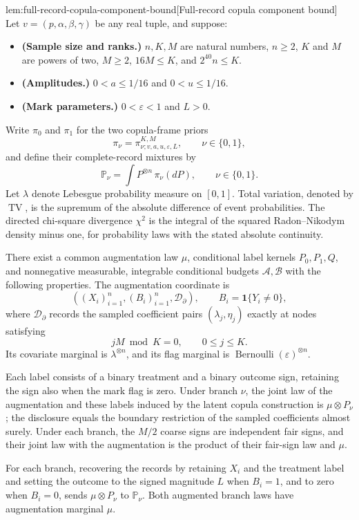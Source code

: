\documentclass[11pt]{article}
\begin{document}
\begin{lemmav}{lem:full-record-copula-component-bound}[Full-record copula component bound]
Let \(v=(p,\alpha,\beta,\gamma)\) be any real tuple, and suppose:
\begin{itemize}
\item \textbf{(Sample size and ranks.)} \(n,K,M\) are natural numbers, \(n\ge2\), \(K\) and \(M\) are powers of two, \(M\ge2\), \(16M\le K\), and \(2^{40}n\le K\).
\item \textbf{(Amplitudes.)} \(0<a\le1/16\) and \(0<u\le1/16\).
\item \textbf{(Mark parameters.)} \(0<\varepsilon<1\) and \(L>0\).
\end{itemize}
Write \(\pi_0\) and \(\pi_1\) for the two copula-frame priors
\[
\pi_\nu=\pi^{K,M}_{\nu;v,a,u,\varepsilon,L},
\qquad \nu\in\{0,1\},
\]
and define their complete-record mixtures by
\[
\mathbb P_\nu=\int P^{\otimes n}\,\pi_\nu(dP),
\qquad \nu\in\{0,1\}.
\]
Let \(\lambda\) denote Lebesgue probability measure on \([0,1]\). Total variation, denoted by \(\operatorname{TV}\), is the supremum of the absolute difference of event probabilities. The directed chi-square divergence \(\chi^2\) is the integral of the squared Radon--Nikodym density minus one, for probability laws with the stated absolute continuity.

There exist a common augmentation law \(\mu\), conditional label kernels \(P_0,P_1,Q\), and nonnegative measurable, integrable conditional budgets \(\mathcal A,\mathcal B\) with the following properties. The augmentation coordinate is
\[
\left((X_i)_{i=1}^n,(B_i)_{i=1}^n,\mathcal D_{\partial}\right),
\qquad B_i=\mathbf1\{Y_i\ne0\},
\]
where \(\mathcal D_{\partial}\) records the sampled coefficient pairs
\((\lambda_j,\eta_j)\) exactly at nodes satisfying
\[
jM\bmod K=0,\qquad 0\le j\le K.
\]
Its covariate marginal is \(\lambda^{\otimes n}\), and its flag marginal is
\(\operatorname{Bernoulli}(\varepsilon)^{\otimes n}\).

Each label consists of a binary treatment and a binary outcome sign, retaining the sign also when the mark flag is zero. Under branch \(\nu\), the joint law of the augmentation and these labels induced by the latent copula construction is \(\mu\otimes P_\nu\); the disclosure equals the boundary restriction of the sampled coefficients almost surely. Under each branch, the \(M/2\) coarse signs are independent fair signs, and their joint law with the augmentation is the product of their fair-sign law and \(\mu\).

For each branch, recovering the records by retaining \(X_i\) and the treatment label and setting the outcome to the signed magnitude \(L\) when \(B_i=1\), and to zero when \(B_i=0\), sends \(\mu\otimes P_\nu\) to \(\mathbb P_\nu\). Both augmented branch laws have augmentation marginal \(\mu\).


\end{lemmav}
\end{document}
